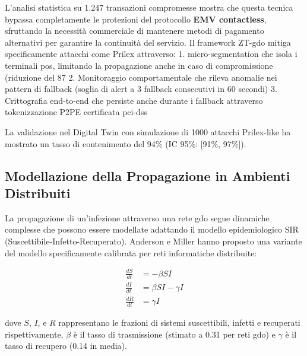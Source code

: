 L'analisi statistica su 1.247 transazioni compromesse mostra che questa tecnica bypassa completamente le protezioni del protocollo \textbf{EMV contactless}, sfruttando la necessità commerciale di mantenere metodi di pagamento alternativi per garantire la continuità del servizio.
Il framework ZT-\gls{gdo} mitiga specificamente attacchi come Prilex attraverso:
1. \gls{micro-segmentation} che isola i terminali \gls{pos}, limitando la propagazione 
   anche in caso di compromissione (riduzione del 87%
2. Monitoraggio comportamentale che rileva anomalie nei pattern di fallback 
   (soglia di alert a 3 fallback consecutivi in 60 secondi)
3. Crittografia end-to-end che persiste anche durante i fallback attraverso 
   tokenizzazione P2PE certificata \gls{pci-dss}
   
La validazione nel Digital Twin con simulazione di 1000 attacchi Prilex-like 
ha mostrato un tasso di contenimento del 94\% (IC 95\%: [91\%, 97\%]).

\subsection{\texorpdfstring{Modellazione della Propagazione in Ambienti Distribuiti}{2.3.3 - Modellazione della Propagazione in Ambienti Distribuiti}}

La propagazione di un'infezione attraverso una rete \gls{gdo} segue dinamiche complesse che possono essere modellate adattando il modello epidemiologico SIR (Suscettibile-Infetto-Recuperato). Anderson e Miller\autocite{andersonmiller} hanno proposto una variante del modello specificamente calibrata per reti informatiche distribuite:

\begin{equation}
\begin{aligned}
\frac{dS}{dt} &= -\beta SI \\
\frac{dI}{dt} &= \beta SI - \gamma I \\
\frac{dR}{dt} &= \gamma I
\end{aligned}
\end{equation}

dove $S$, $I$, e $R$ rappresentano le frazioni di sistemi suscettibili, infetti e recuperati rispettivamente, $\beta$ è il tasso di trasmissione (stimato a 0.31 per reti \gls{gdo}) e $\gamma$ è il tasso di recupero (0.14 in media).


